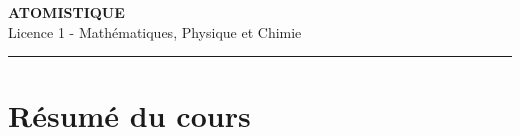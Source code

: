 \documentclass[12pt,a4paper]{article}
\begin{document}
\fi

\begin{center}
  {\LARGE\bfseries ATOMISTIQUE}\\[0.3cm]
  {\normalsize Licence 1 - Mathématiques, Physique et Chimie}\\[0.1cm]
  \rule{0.7\textwidth}{0.8pt}
\end{center}

\vspace{0.3cm}

\section*{Résumé du cours}
\end{document}
